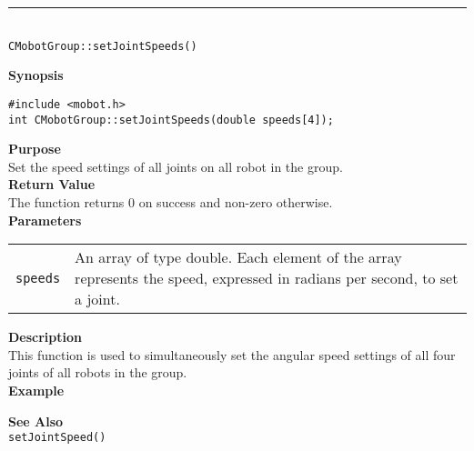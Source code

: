 \noindent
\vspace{5pt}
\rule{4.5in}{0.015in}\\
\noindent
{\LARGE \texttt{CMobotGroup::setJointSpeeds()}}\\
{}

\noindent
{\bf Synopsis}\\
\begin{verbatim}
#include <mobot.h>
int CMobotGroup::setJointSpeeds(double speeds[4]);
\end{verbatim}

\noindent
{\bf Purpose}\\
Set the speed settings of all joints on all robot in the group.\\

\noindent
{\bf Return Value}\\
The function returns 0 on success and non-zero otherwise.\\

\noindent
{\bf Parameters}
\vspace{-0.1in}
\begin{description}
\item               
\begin{tabular}{p{10 mm}p{145 mm}}
\texttt{speeds} & An array of type double. Each element of the array
represents the speed, expressed in radians per second, to set a joint. \\
\end{tabular}
\end{description}

\noindent
{\bf Description}\\
This function is used to simultaneously set the angular speed settings of
all four joints of all robots in the group. \\

\noindent
{\bf Example}\\
\noindent

\noindent
{\bf See Also}\\
\texttt{setJointSpeed()}

